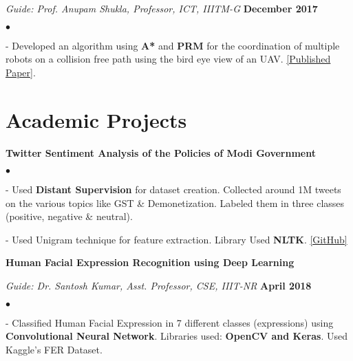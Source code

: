 \documentclass[margin,line]{res}
\newenvironment{list2}{
  \begin{list}{$\bullet$}{%
      \setlength{\itemsep}{0in}
      \setlength{\parsep}{0in} \setlength{\parskip}{0in}
      \setlength{\topsep}{0in} \setlength{\partopsep}{0in} 
      \setlength{\leftmargin}{0.2in}}}{\end{list}}
\begin{document}
\begin{resume}
\vspace{-.3cm}
{\em Guide: Prof. Anupam Shukla, Professor, ICT, IIITM-G} \hfill {\bf December 2017}\\
\vspace*{-.4cm}
\begin{list2}
\item[-] Developed an algorithm using {\bf A*} and {\bf PRM} for the coordination of multiple robots on a collision free path using the bird eye view of an UAV. \textcolor{blue}{\href{https://doi.org/10.1016/j.procs.2018.07.052}{[Published Paper]}}.
\end{list2}

\vspace{-.1in}
\section{\sc Academic Projects}


{\bf Twitter Sentiment Analysis of the Policies of Modi Government}
\begin{list2}
\item[-] Used {\bf Distant Supervision} for dataset creation. Collected around 1M tweets on the various topics like GST \& Demonetization. Labeled them in three classes (positive, negative \& neutral).
\item[-] Used Unigram technique for feature extraction. Library Used {\bf NLTK}.
\textcolor{blue}{\href{https://github.com/panditu2015/Sentiment-Analysis}{[GitHub]}}
\end{list2}

\vspace{-.1in}
{\bf Human Facial Expression Recognition using Deep Learning}
\vspace{-.4cm}

{\em Guide: Dr. Santosh Kumar, Asst. Professor, CSE, IIIT-NR} \hfill {\bf April 2018}\\

\vspace*{-.3cm}
\begin{list2}
\item[-] Classified Human Facial Expression in 7 different classes (expressions) using {\bf Convolutional Neural Network}. Libraries used: {\bf OpenCV and Keras}. Used Kaggle's FER Dataset.
\end{list2}


\end{resume}
\end{document}
